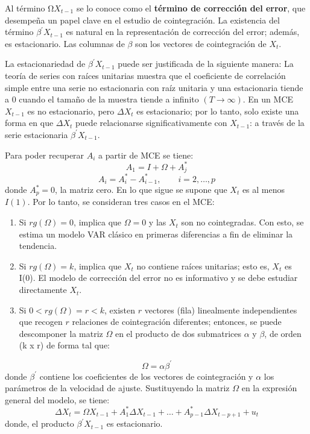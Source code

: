 Al t\'{e}rmino $\mathrm{\Omega }X_{t-1}$ se lo conoce como el \textbf{t\'{e}rmino de correcci\'{o}n del error}, que desempe\~{n}a un papel clave en el estudio de cointegraci\'{o}n. La existencia del t\'{e}rmino $\beta^{'}X_{t-1}$ es natural en la representaci\'{o}n de correcci\'{o}n del error; adem\'{a}s, es estacionario. Las columnas de $\beta$ son los vectores de cointegraci\'{o}n de $X_{t}$.\newline

La estacionariedad de $\beta^{'} X_{t-1}$ puede ser justificada de la siguiente manera: La teor\'{i}a de series con ra\'{i}ces unitarias muestra que el coeficiente de correlaci\'{o}n simple entre una serie no estacionaria con ra\'{i}z unitaria y una estacionaria tiende a 0 cuando el tama\~{n}o de la muestra tiende a infinito $(T\to \infty )$. En un MCE $X_{t-1}$ es no estacionario, pero $\Delta X_{t}$ es estacionario; por lo tanto, solo existe una forma en que $\Delta X_{t}$ puede relacionarse significativamente con $X_{t-1}$: a trav\'{e}s de la serie estacionaria $\beta^{'} X_{t-1}$.\newline

Para poder recuperar $A_{i}$ a partir de MCE se tiene:
\[
A_{1}=I+\Omega +A_{j}^{\ast }
\]
\[
A_{i}=A_{i}^{\ast}-A_{i-1}^{\ast },\qquad i=2,\ldots ,p
\]
donde $A_{p}^{\ast}=0$, la matriz cero. En lo que sigue se supone que $X_{t}$ es al menos $I(1)$. Por lo tanto, se consideran tres casos en el MCE:

\begin{enumerate}
      \item Si $rg(\Omega)=0$, implica que $\Omega=0$ y las $X_{t}$ son no cointegradas. Con esto, se estima un modelo VAR cl\'{a}sico en primeras diferencias a fin de eliminar la tendencia.
      \item Si $rg(\Omega)=k$, implica que $X_{t}$ no contiene ra\'{i}ces unitarias; esto es, $X_{t}$ es I(0). El modelo de correcci\'{o}n del error no es informativo y se debe estudiar directamente $X_{t}$. 
      \item Si $0<rg(\Omega)=r < k$, existen $r$ vectores (fila) linealmente independientes que recogen $r$ relaciones de cointegraci\'{o}n diferentes; entonces, se puede descomponer la matriz $\Omega$ en el producto de dos submatrices $\alpha$ y $\beta$, de orden (k x r) de forma tal que:
\end{enumerate}

\[
\Omega =\alpha\beta^{'}
\]
donde $\beta^{'}$ contiene los coeficientes de los vectores de cointegraci\'{o}n y $\alpha$ los par\'{a}metros de la velocidad de ajuste. Sustituyendo la matriz $\Omega$ en la expresi\'{o}n general del modelo, se tiene:
\[
\Delta X_{t}=\Omega X_{t-1}+A_{1}^{\ast}\Delta X_{t-1}+\ldots +A_{p-1}^{\ast}\Delta X_{t-p+1}+u_{t}
\]
donde, el producto $\beta^{'} X_{t-1}$ es estacionario.

